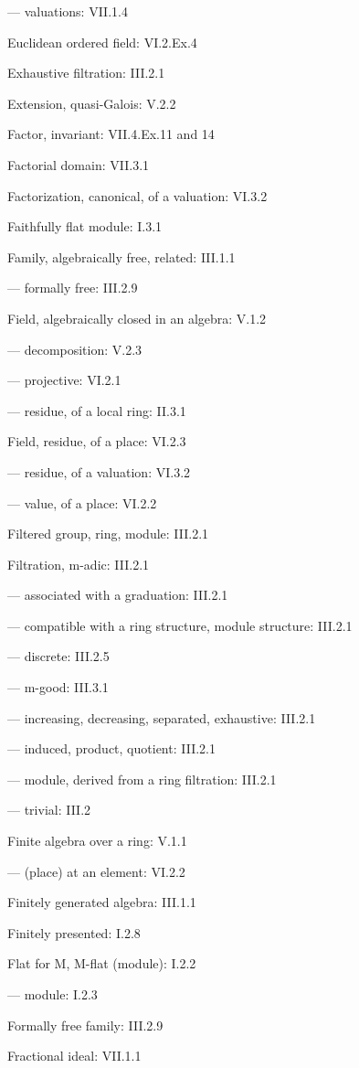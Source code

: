 --- valuations: VII.1.4

Euclidean ordered field: VI.2.Ex.4

Exhaustive filtration: III.2.1

Extension, quasi-Galois: V.2.2

Factor, invariant: VII.4.Ex.11 and 14

Factorial domain: VII.3.1

Factorization, canonical, of a valuation: VI.3.2

Faithfully flat module: I.3.1

Family, algebraically free, related: III.1.1

--- formally free: III.2.9

Field, algebraically closed in an algebra: V.1.2

--- decomposition: V.2.3

--- projective: VI.2.1

--- residue, of a local ring: II.3.1

Field, residue, of a place: VI.2.3

--- residue, of a valuation: VI.3.2

--- value, of a place: VI.2.2

Filtered group, ring, module: III.2.1

Filtration, m-adic: III.2.1

--- associated with a graduation: III.2.1

--- compatible with a ring structure, module structure: III.2.1

--- discrete: III.2.5

--- m-good: III.3.1

--- increasing, decreasing, separated, exhaustive: III.2.1

--- induced, product, quotient: III.2.1

--- module, derived from a ring filtration: III.2.1

--- trivial: III.2

Finite algebra over a ring: V.1.1

--- (place) at an element: VI.2.2

Finitely generated algebra: III.1.1

Finitely presented: I.2.8

Flat for M, M-flat (module): I.2.2

--- module: I.2.3

Formally free family: III.2.9

Fractional ideal: VII.1.1

